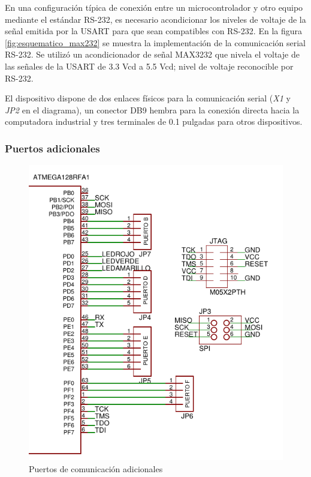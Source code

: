 En una configuración típica de conexión entre un microcontrolador y otro equipo mediante el estándar RS-232, es necesario acondicionar los niveles de voltaje de la señal emitida por la USART para que sean compatibles con RS-232. En la figura \ref{fig:esquematico_max232} se muestra la implementación de la comunicación serial RS-232. Se utilizó un acondicionador de señal MAX3232\cite{dev:max3232} que nivela el voltaje de las señales de la USART de 3.3 Vcd a 5.5 Vcd; nivel de voltaje reconocible por RS-232. 

El dispositivo dispone de dos enlaces físicos para la comunicación serial (\textit{X1} y \textit{JP2} en el diagrama), un conector DB9 hembra para la conexión directa hacia la computadora industrial y tres terminales de 0.1 pulgadas para otros dispositivos.   



\subsubsection{Puertos adicionales}

\begin{figure}
	\centering
	\includegraphics[scale=0.8]{capitulo_3_imgs/esquematico_puertos.pdf}
	\caption{Puertos de comunicación adicionales}
	\label{fig:esquematico_puertos}
\end{figure}

